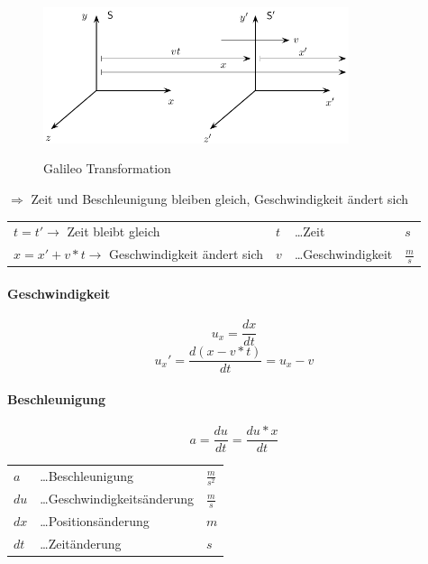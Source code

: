 \documentclass[a4paper,11pt]{article}
\begin{document}
\begin{figure}[!ht]
\centering
\includegraphics[width=0.8\textwidth]{galileo-transformation.png}\\
\caption[http://html.smartpub.dk/egaagymnasium/infogeist\--eg12\--fy/]{Galileo Transformation}
\end{figure}
\begin{center}
    $\Rightarrow$ Zeit und Beschleunigung bleiben gleich, Geschwindigkeit ändert sich
\end{center}

\begin{tabular}{l l l l}
    $t = t' \rightarrow$ Zeit bleibt gleich & $t$ &\dots Zeit & $s$\\
    $x = x' + v*t \rightarrow$ Geschwindigkeit ändert sich & $v$ &\dots Geschwindigkeit & $\frac{m}{s}$\\
\end{tabular}

\paragraph{Geschwindigkeit}
$$u_{x} = \frac{dx}{dt}$$
$$u_{x}' = \frac{d(x - v*t)}{dt} = u_x - v$$

\paragraph{Beschleunigung}
$$a = \frac{du}{dt} = \frac{du * x}{dt}$$

\begin{center}
    \begin{tabular}{l l l}
        $a$ &\dots Beschleunigung & $\frac{m}{s^2}$\\
        $du$ &\dots Geschwindigkeitsänderung & $\frac{m}{s}$\\
        $dx$ &\dots Positionsänderung & $m$\\
        $dt$ &\dots Zeitänderung & $s$
    \end{tabular}
\end{center}
\end{document}
